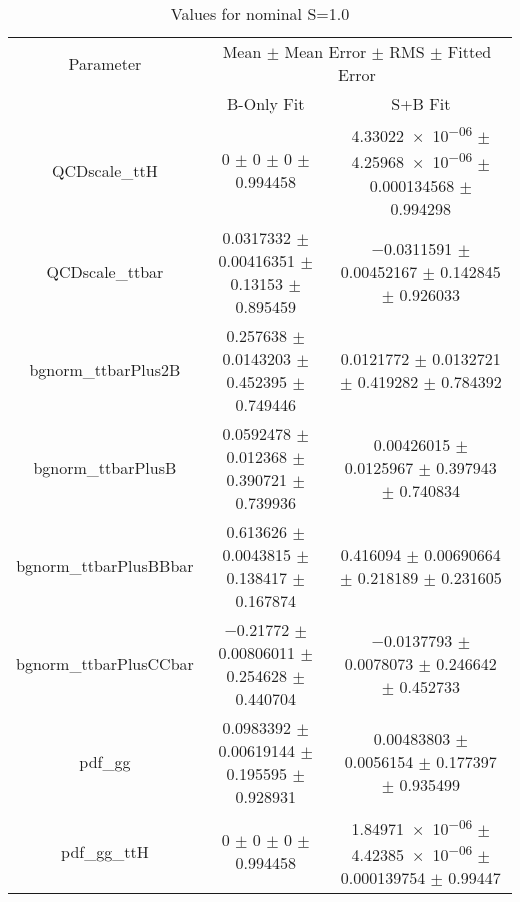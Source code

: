 \begin{table}
\centering
\caption{Values for nominal S=1.0}
\begin{tabular}{ccc}
\toprule
Parameter & \multicolumn{2}{c}{Mean $\pm$ Mean Error $\pm$ RMS $\pm$ Fitted Error}\\
 & B-Only Fit & S+B Fit\\
\midrule
QCDscale\_ttH & \num{0} $\pm$ \num{0} $\pm$ \num{0} $\pm$ \num{0.994458} & \num{4.33022e-06} $\pm$ \num{4.25968e-06} $\pm$ \num{0.000134568} $\pm$ \num{0.994298}\\
QCDscale\_ttbar & \num{0.0317332} $\pm$ \num{0.00416351} $\pm$ \num{0.13153} $\pm$ \num{0.895459} & \num{-0.0311591} $\pm$ \num{0.00452167} $\pm$ \num{0.142845} $\pm$ \num{0.926033}\\
bgnorm\_ttbarPlus2B & \num{0.257638} $\pm$ \num{0.0143203} $\pm$ \num{0.452395} $\pm$ \num{0.749446} & \num{0.0121772} $\pm$ \num{0.0132721} $\pm$ \num{0.419282} $\pm$ \num{0.784392}\\
bgnorm\_ttbarPlusB & \num{0.0592478} $\pm$ \num{0.012368} $\pm$ \num{0.390721} $\pm$ \num{0.739936} & \num{0.00426015} $\pm$ \num{0.0125967} $\pm$ \num{0.397943} $\pm$ \num{0.740834}\\
bgnorm\_ttbarPlusBBbar & \num{0.613626} $\pm$ \num{0.0043815} $\pm$ \num{0.138417} $\pm$ \num{0.167874} & \num{0.416094} $\pm$ \num{0.00690664} $\pm$ \num{0.218189} $\pm$ \num{0.231605}\\
bgnorm\_ttbarPlusCCbar & \num{-0.21772} $\pm$ \num{0.00806011} $\pm$ \num{0.254628} $\pm$ \num{0.440704} & \num{-0.0137793} $\pm$ \num{0.0078073} $\pm$ \num{0.246642} $\pm$ \num{0.452733}\\
pdf\_gg & \num{0.0983392} $\pm$ \num{0.00619144} $\pm$ \num{0.195595} $\pm$ \num{0.928931} & \num{0.00483803} $\pm$ \num{0.0056154} $\pm$ \num{0.177397} $\pm$ \num{0.935499}\\
pdf\_gg\_ttH & \num{0} $\pm$ \num{0} $\pm$ \num{0} $\pm$ \num{0.994458} & \num{1.84971e-06} $\pm$ \num{4.42385e-06} $\pm$ \num{0.000139754} $\pm$ \num{0.99447}\\
\bottomrule
\end{tabular}
\end{table}